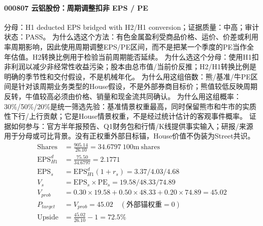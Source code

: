 \paragraph{000807 云铝股份：周期调整扣非 EPS / PE}
分母：H1 deducted EPS bridged with H2/H1 conversion；证据质量：中高；审计状态：PASS。
为什么选这个方法：有色金属盈利受商品价格、运价、价差或利用率周期影响，因此使用周期调整EPS/PE区间，而不是把某一个季度的PE当作全年估值。H2转换比例用于检验当前周期能否延续。
为什么选这个分母：使用H1扣非利润以减少非经常性收益污染；股本由总市值/当前价反推；H2/H1转换比例是明确的季节性和交付假设，不是机械年化。
为什么用这组倍数：熊/基准/牛PE区间是针对该周期业务类型的House假设，不是外部券商目标价；熊值较低反映周期反转，牛值较高必须由价格、销量和现金流共同确认。
为什么用这组概率：30\%/50\%/20\%是统一筛选先验：基准情景权重最高，同时保留熊市和牛市的实质性下行/上行贡献；它是House情景权重，不是经过统计估计的客观事件概率。
证据如何参与：官方半年报预告、Q1财务包和行情/K线提供事实输入；研报/来源用于分母或可比背景。没有正权重外部目标锚，House价值不伪装为Street共识。
\begin{align*}
\mathrm{Shares} &= \frac{905.14}{26.10}=34.6797\ \mathrm{100m\ shares}\\
\mathrm{EPS}_{H1}^d &= \frac{75.50}{34.6797}=2.1771\\
\mathrm{EPS}_s &= \mathrm{EPS}_{H1}^d(1+r_s)=3.37/4.03/4.68\\
V_s &= \mathrm{EPS}_s\times \mathrm{PE}_s=19.58/48.33/74.89\\
V_{prob} &= 0.30\times 19.58+0.50\times 48.33+0.20\times 74.89=45.02\\
P_{target} &= V_{prob}=45.02\quad(\text{外部锚权重}=0)\\
\mathrm{Upside} &= \frac{45.02}{26.10}-1=72.5\%\\
\end{align*}

